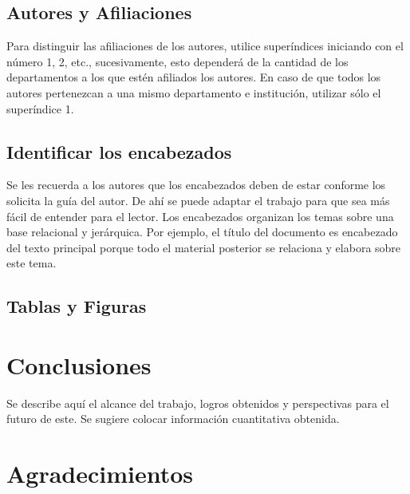     \subsection{Autores y Afiliaciones}
    
    Para distinguir las afiliaciones de los autores, utilice superíndices iniciando con el número 1, 2, etc., sucesivamente, esto dependerá de la cantidad de los departamentos a los que estén afiliados los autores. En caso de que todos los autores pertenezcan a una mismo departamento e institución, utilizar sólo el superíndice 1. 
    
    \subsection{Identificar los encabezados}
    
    Se les recuerda a los autores que los encabezados deben de estar conforme los solicita la guía del autor. De ahí se puede adaptar el trabajo para que sea más fácil de entender para el lector.
    Los encabezados organizan los temas sobre una base relacional y jerárquica. Por ejemplo, el título del documento es encabezado del texto principal porque todo el material posterior se relaciona y elabora sobre este tema. 
    
    \subsection{Tablas y Figuras}
    
    \label{Evidencia del funcionamiento del ESP-32.pdf}
    
    \begin{enumerate}
    \end{enumerate}  
    
    \section{Conclusiones}
    
    Se describe aquí el alcance del trabajo, logros obtenidos y perspectivas para el futuro de este. Se sugiere colocar información cuantitativa obtenida.
    
    \section{Agradecimientos}
    
